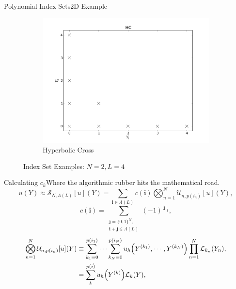 \documentclass{beamer}
\begin{document}
\begin{frame}{Polynomial Index Sets}{2D Example}
\begin{figure}[H]
\begin{subfigure}[b]{0.32 \textwidth}
   \includegraphics[width=\textwidth]{../graphics/HC}
   \caption{Hyperbolic Cross}
   \label{HC}
  \end{subfigure}
  \caption{Index Set Examples: $N=2,L=4$}
  \label{indexsets}
\end{figure}
\end{frame}

\begin{frame}{Calculating $c_k$}{Where the algorithmic rubber hits the mathematical road.}
\normalsize\vspace{-20pt}
\begin{equation*}
u(Y)\approx\mathcal{S}_{N,\Lambda(L)}[u](Y)=\sum_{\boldsymbol{i}\in\Lambda(L)}c(\boldsymbol{i})\bigotimes_{n=1}^N\mathcal{U}_{n,p(i_n)}[u](Y),
\end{equation*}
\begin{equation*}
c(\boldsymbol{i})=\sum_{\substack{\boldsymbol{j}=\{0,1\}^N,\\ \boldsymbol{i}+\boldsymbol{j}\in\Lambda(L)}}(-1)^{|\boldsymbol{j}|_1},
\end{equation*}
\begin{align*}
\bigotimes_{n=1}^N\mathcal{U}_{n,p(i_n)}[u](Y)&\equiv\sum_{k_1=0}^{p(i_1)}\cdots\sum_{k_N=0}^{p(i_N)}u_h\qty(Y^{(k_1)},\cdots,Y^{(k_N)})\prod_{n=1}^N \mathcal{L}_{k_n}(Y_n),\\
  &=\sum_{k}^{p(\vec i)}u_h\qty(Y^{(k)})\mathcal{L}_k(Y),
\end{align*}
\end{frame}
\end{document}
